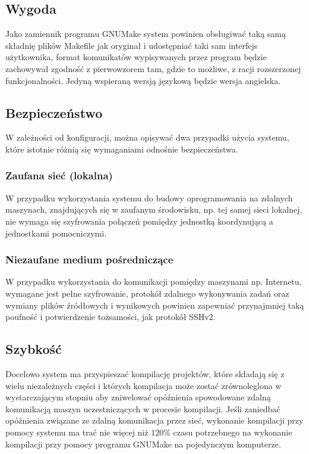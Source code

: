 \documentclass[a4paper]{article}
\begin{document}
\subsection{Wygoda}

Jako zamiennik programu GNUMake system powinien obsługiwać taką samą składnię plików Makefile jak oryginał i udostępniać taki sam interfejs użytkownika, format komunikatów wypisywanych przez program będzie zachowywał zgodność z pierwowzorem tam, gdzie to możliwe, z racji rozszerzonej funkcjonalności.
Jedyną wspieraną wersją językową będzie wersja angielska.

\subsection{Bezpieczeństwo}

W zależności od konfiguracji, można opisywać dwa przypadki użycia systemu, które istotnie różnią się wymaganiami odnośnie bezpieczeństwa.

\subsubsection{Zaufana sieć (lokalna)}

W przypadku wykorzystania systemu do budowy oprogramowania na zdalnych maszynach, znajdujących się w zaufanym środowisku, np. tej samej sieci lokalnej, nie wymaga się szyfrowania połączeń pomiędzy jednostką koordynującą a jednostkami pomocniczymi.

\subsubsection{Niezaufane medium pośredniczące}

W przypadku wykorzystania do komunikacji pomiędzy maszynami np. Internetu, wymagane jest pełne szyfrowanie, protokół zdalnego wykonywania zadań oraz wymiany plików źródłowych i wynikowych powinien zapewniać przynajmniej taką poufność i potwierdzenie tożsamości, jak protokół SSHv2.

\subsection{Szybkość}

Docelowo system ma przyspieszać kompilację projektów, które składają się z wielu niezależnych części i których kompilacja może zostać zrównoleglona w wystarczającym stopniu aby zniwelować opóźnienia spowodowane zdalną komunikacją maszyn uczestniczących w procesie kompilacji.
Jeśli zaniedbać opóźnienia związane ze zdalną komunikacja przez sieć, wykonanie kompilacji przy pomocy systemu ma trać nie więcej niż $120\%$ czasu potrzebnego na wykonanie kompilacji przy pomocy programu GNUMake na pojedynczym komputerze.
\end{document}
